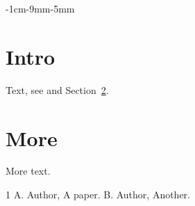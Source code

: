 \documentclass{article}
\begin{document}
\begin{changemargin}{-1cm}{-9mm}{-5mm}
\section{Intro}\label{s:i}
Text, see \cite{a} and Section~\ref{s:m}.
\section{More}\label{s:m}
More text.
\begin{thebibliography}{1}
 A. Author, A paper.
 B. Author, Another.
\end{thebibliography}
\end{changemargin}
\end{document}
